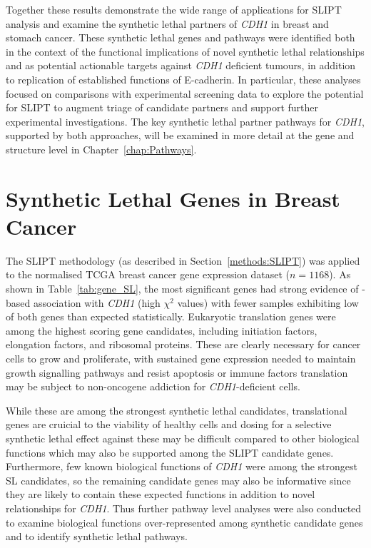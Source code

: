 Together these results demonstrate the wide range of applications for \gls{SLIPT} analysis and examine the \gls{synthetic lethal} partners of \textit{CDH1} in breast and stomach cancer. These \gls{synthetic lethal} genes and pathways were identified both in the context of the functional implications of novel \gls{synthetic lethal} relationships and as potential actionable targets against \textit{CDH1} deficient tumours, in addition to replication of established functions of \gls{E-cadherin}. In particular, these analyses focused on comparisons with experimental screening data to explore the potential for \gls{SLIPT} to augment triage of candidate partners and support further experimental investigations. The key \gls{synthetic lethal} partner pathways for \textit{CDH1}, supported by both approaches, will be examined in more detail at the gene and  structure level in Chapter~\ref{chap:Pathways}.



\section{Synthetic Lethal Genes in Breast Cancer} \label{chapt3:exprSL_genes}

The \gls{SLIPT} methodology (as described in Section~\ref{methods:SLIPT}) was applied to the normalised \gls{TCGA} breast cancer \gls{gene expression} dataset ($n = 1168$). As shown in Table~\ref{tab:gene_SL}, the most significant genes had strong evidence of -based association with \textit{CDH1} (high $\chi^2$ values) with fewer samples exhibiting low  of both genes than expected statistically. Eukaryotic translation genes were among the highest scoring gene candidates, including initiation factors, elongation factors, and ribosomal proteins. These are clearly necessary for cancer cells to grow and proliferate, with sustained \gls{gene expression} needed to maintain growth signalling pathways and resist apoptosis or immune factors translation may be subject to \gls{non-oncogene addiction} for \textit{CDH1}-deficient cells.

While these are among the strongest \gls{synthetic lethal} candidates, translational genes are cruicial to the viability of healthy cells and dosing for a selective \gls{synthetic lethal} effect against these may be difficult compared to other biological functions which may also be supported among the \gls{SLIPT} candidate genes. Furthermore, few known biological functions of \textit{CDH1} were among the strongest SL candidates, so the remaining candidate genes may also be informative since they are likely to contain these expected functions in addition to novel relationships for \textit{CDH1}. Thus further pathway level analyses were also conducted to examine biological functions over-represent\-ed among synthetic candidate genes and to identify \gls{synthetic lethal} pathways.

